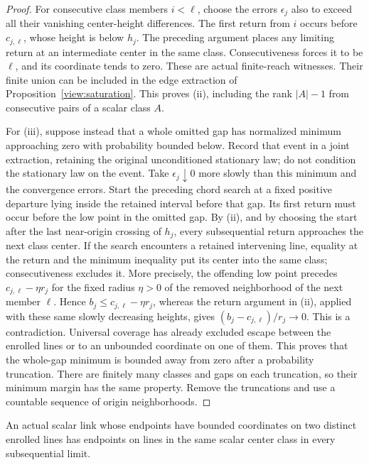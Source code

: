 \begin{proof}
For consecutive class members $i<\ell$, choose the errors $\epsilon_j$
also to exceed all their vanishing center-height differences.  The first
return from $i$ occurs before $c_{j,\ell}$, whose height is below $h_j$.
The preceding argument places any limiting return at an intermediate
center in the same class.  Consecutiveness forces it to be $\ell$, and
its coordinate tends to zero.  These are actual finite-reach witnesses.
Their finite union can be included in the edge extraction of
Proposition~\ref{view:saturation}.  This proves (ii), including the rank
$|A|-1$ from consecutive pairs of a scalar class $A$.

For (iii), suppose instead that a whole omitted gap has normalized
minimum approaching zero with probability bounded below.  Record that
event in a joint extraction, retaining the original unconditioned
stationary law; do not condition the stationary law on the event.
Take $\epsilon_j\downarrow0$ more slowly than this minimum and the
convergence errors.  Start the preceding chord search at a fixed
positive departure lying inside the retained interval before that gap.
Its first return must occur before the low point in the omitted gap.
By (ii), and by choosing the start after the last near-origin crossing
of $h_j$, every subsequential return approaches the next class center.
If the search encounters a retained intervening line, equality at the
return and the minimum inequality put its center into the same class;
consecutiveness excludes it.  More precisely, the offending low point
precedes $c_{j,\ell}-\eta r_j$ for the fixed radius $\eta>0$ of the
removed neighborhood of the next member $\ell$.  Hence
$b_j\le c_{j,\ell}-\eta r_j$, whereas the return argument in (ii),
applied with these same slowly decreasing heights, gives
$(b_j-c_{j,\ell})/r_j\to0$.  This is a contradiction.  Universal coverage
has already excluded escape between the enrolled lines or to an
unbounded coordinate on one of them.  This proves that the
whole-gap minimum is bounded away from zero after a probability
truncation.  There are finitely many classes and gaps on each truncation,
so their minimum margin has the same property.  Remove the truncations
and use a countable sequence of origin neighborhoods.
\end{proof}

\begin{corollary}
\label{view:interline-class}
An actual scalar link whose endpoints have bounded coordinates on two
distinct enrolled lines has endpoints on lines in the same scalar center
class in every subsequential limit.
\end{corollary}

